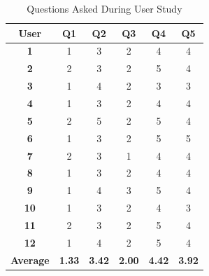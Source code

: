 \documentclass[11pt,a4paper]{article}
\begin{document}
\begin{table}[h!]
\begin{tabular}{|c|c|c|c|c|c|}
    \hline \bf User & \bf Q1 & \bf Q2 & \bf Q3 & \bf Q4 & \bf Q5 \\  
    \hline
    \bf 1 & 1 & 3 & 2 & 4 & 4 \\ 
    \bf 2 & 2 & 3 & 2 & 5 & 4 \\ 
    \bf 3 & 1 & 4 & 2 & 3 & 3 \\ 
    \bf 4 & 1 & 3 & 2 & 4 & 4 \\ 
    \bf 5 & 2 & 5 & 2 & 5 & 4 \\ 
    \bf 6 & 1 & 3 & 2 & 5 & 5 \\ 
    \bf 7 & 2 & 3 & 1 & 4 & 4 \\ 
    \bf 8 & 1 & 3 & 2 & 4 & 4 \\ 
    \bf 9 & 1 & 4 & 3 & 5 & 4 \\ 
    \bf 10 & 1 & 3 & 2 & 4 & 3 \\ 
    \bf 11 & 2 & 3 & 2 & 5 & 4 \\ 
    \bf 12 & 1 & 4 & 2 & 5 & 4 \\ 
    \hline
    \bf Average & \bf 1.33 & \bf 3.42 & \bf 2.00 & \bf 4.42 & \bf 3.92 \\ 
    \hline
\end{tabular}
\caption{\label{user-table} Questions Asked During User Study}
\end{table}
\end{document}
